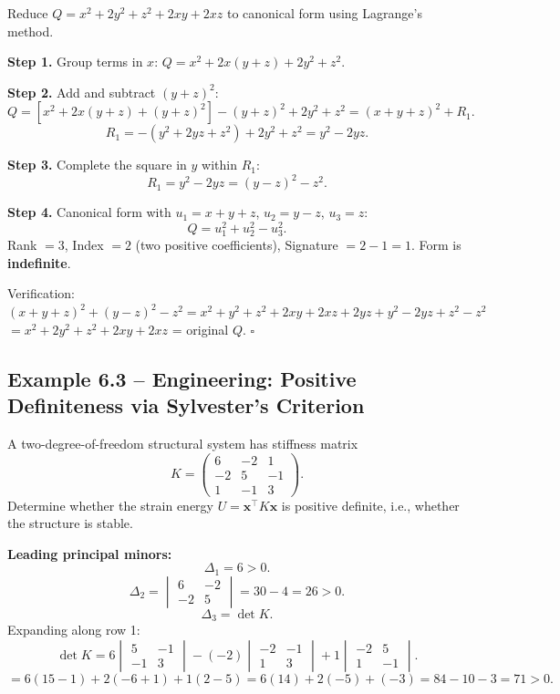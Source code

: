 \documentclass[12pt,a4paper]{article}
\begin{document}
Reduce $Q = x^{2} + 2y^{2} + z^{2} + 2xy + 2xz$ to canonical form using Lagrange's method.

\textbf{Step 1.} Group terms in $x$: $Q = x^{2} + 2x(y+z) + 2y^{2} + z^{2}$.

\textbf{Step 2.} Add and subtract $(y+z)^{2}$:
\[
Q = [x^{2} + 2x(y+z) + (y+z)^{2}] - (y+z)^{2} + 2y^{2} + z^{2}
  = (x+y+z)^{2} + R_1.
\]
\[
R_1 = -(y^{2}+2yz+z^{2}) + 2y^{2} + z^{2} = y^{2} - 2yz.
\]

\textbf{Step 3.} Complete the square in $y$ within $R_1$:
\[
R_1 = y^{2} - 2yz = (y-z)^{2} - z^{2}.
\]

\textbf{Step 4.} Canonical form with $u_1 = x+y+z$, $u_2 = y-z$, $u_3 = z$:
\[
\boxed{Q = u_1^{2} + u_2^{2} - u_3^{2}.}
\]
Rank $= 3$, Index $= 2$ (two positive coefficients), Signature $= 2-1 = 1$. Form is \textbf{indefinite}.

Verification: $(x+y+z)^{2}+(y-z)^{2}-z^{2} = x^{2}+y^{2}+z^{2}+2xy+2xz+2yz + y^{2}-2yz+z^{2}-z^{2}$
$= x^{2}+2y^{2}+z^{2}+2xy+2xz$ = original $Q$. \checkmark \hfill$\square$

\subsection*{Example 6.3 -- Engineering: Positive Definiteness via Sylvester's Criterion}

A two-degree-of-freedom structural system has stiffness matrix
\[
K = \begin{pmatrix} 6 & -2 & 1 \\ -2 & 5 & -1 \\ 1 & -1 & 3 \end{pmatrix}.
\]
Determine whether the strain energy $U = \mathbf{x}^{\top}K\mathbf{x}$ is positive definite, i.e., whether the structure is stable.

\textbf{Leading principal minors:}
\[
\Delta_1 = 6 > 0.
\]
\[
\Delta_2 = \begin{vmatrix}6&-2\\-2&5\end{vmatrix} = 30 - 4 = 26 > 0.
\]
\[
\Delta_3 = \det K.
\]
Expanding along row 1:
\[
\det K = 6\begin{vmatrix}5&-1\\-1&3\end{vmatrix}
        - (-2)\begin{vmatrix}-2&-1\\1&3\end{vmatrix}
        + 1\begin{vmatrix}-2&5\\1&-1\end{vmatrix}.
\]
\[
= 6(15-1) + 2(-6+1) + 1(2-5)
= 6(14) + 2(-5) + (-3)
= 84 - 10 - 3 = 71 > 0.
\]
\end{document}
